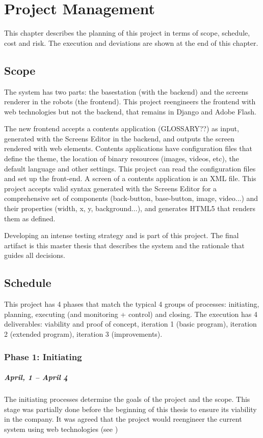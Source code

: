\chapter{Project Management}
This chapter describes the planning of this project in terms of scope, schedule, cost and risk.
The execution and deviations are shown at the end of this chapter.

\section{Scope}
\label{sec:scope}
The system has two parts: the basestation (with the backend) and the screens renderer in the robots (the frontend).
This project reengineers the frontend with web technologies but not the backend, that remains in Django and Adobe Flash.

The new frontend accepts a contents application (GLOSSARY??) as input, generated with the Screens Editor in the backend, and outputs the screen rendered with web elements.
Contents applications have configuration files that define the theme, the location of binary resources (images, videos, etc), the default language and other settings. 
This project can read the configuration files and set up the front-end.
A screen of a contents application is an \ac{XML} file. 
This project accepts valid syntax generated with the Screens Editor for a comprehensive set of components (back-button, base-button, image, video...) and their properties (width, x, y, background...), and generates HTML5 that renders them as defined.

Developing an intense testing strategy and is part of this project.
The final artifact is this master thesis that describes the system and the rationale that guides all decisions.

\section{Schedule}
This project has 4 phases that match the typical 4 groups of processes: initiating, planning, executing (and monitoring + control) and closing.
The execution has 4 deliverables: viability and proof of concept, iteration 1 (basic program), iteration 2 (extended program), iteration 3 (improvements).

\subsection{Phase 1: Initiating}
\paragraph{April, 1 -- April 4}
The initiating processes determine the goals of the project and the scope.
This stage was partially done before the beginning of this thesis to ensure its viability in the company.
It was agreed that the project would reengineer the current system using web technologies (see )

